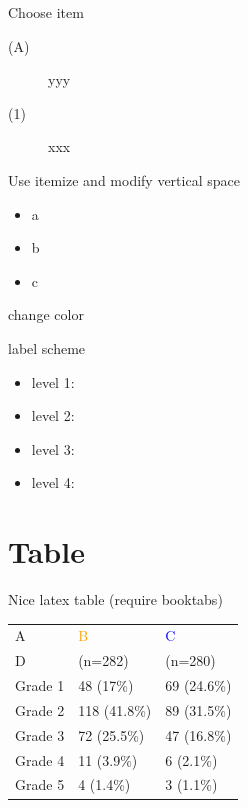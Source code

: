 \documentclass[table]{beamer}
\begin{document}
\begin{frame}[label={sec:org08287cb}]{Choose item}
\begin{description}
\item[{(A)}] yyy
\item[{(1)}] xxx
\end{description}
\end{frame}

\begin{frame}[label={sec:orgeb4841f}]{Use itemize and modify vertical space}
\begin{itemize}[label={-},topsep=0pt,itemsep=0mm]
\item a
\item b
\item c
\end{itemize}
\end{frame}

\begin{frame}[label={sec:org9d5a6e7}]{change color}
\end{frame}

\begin{frame}[label={sec:orgb9739f0}]{label scheme}
\begin{itemize}
\item level 1: \textbullet
\item level 2: \textendash
\item level 3: \textasteriskcentered
\item level 4: \textperiodcentered
\end{itemize}
\end{frame}

\section{Table}
\label{sec:org2d37994}

\begin{frame}[label={sec:orgad9f8de}]{Nice latex table}
(require booktabs)

\begin{table}
\begin{tabular}{lll}
\toprule
A  & \textcolor{orange}{B} & \textcolor{blue}{C} \\
D & (n=282)  & (n=280) \\
\midrule
Grade 1 & 48 (17\%)  & 69 (24.6\%) \\
Grade 2 & 118 (41.8\%)  & 89 (31.5\%) \\
Grade 3 & 72 (25.5\%)  & 47 (16.8\%) \\
Grade 4 & 11 (3.9\%) & 6 (2.1\%) \\
Grade 5 & 4 (1.4\%)  & 3 (1.1\%) \\
\bottomrule
\end{tabular}
\end{table}
\end{frame}
\end{document}
